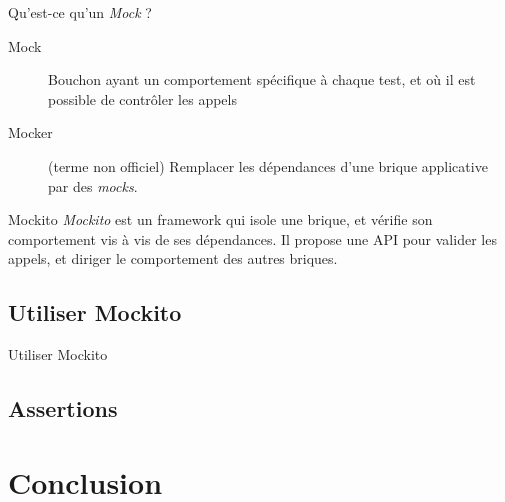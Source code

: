 \documentclass[compress]{beamer}%
\begin{document}
\begin{frame}{Qu'est-ce qu'un \emph{Mock} ?}

	\begin{description}
	\item[Mock] Bouchon ayant un comportement spécifique à chaque test, et où il est possible de contrôler les appels
	\item[Mocker] (terme non officiel) Remplacer les dépendances d'une brique applicative par des \emph{mocks}.
	\end{description}

	\pause
	\begin{block}{Mockito}
		\emph{Mockito} est un framework qui isole une brique, et vérifie son comportement vis à vis de ses dépendances. Il propose une API pour valider les appels, et diriger le comportement des autres briques.
	\end{block}

\end{frame}

\subsection{Utiliser Mockito}
\begin{frame}{Utiliser Mockito}

\end{frame}

\subsection{Assertions}


\section{Conclusion}
\end{document}
